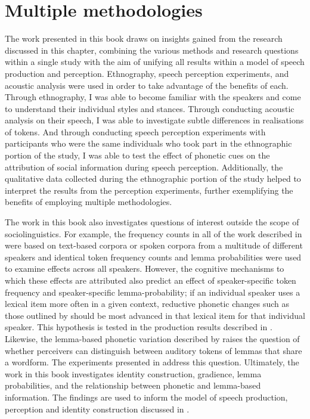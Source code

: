  \section{Multiple methodologies}
The work presented in this book draws on insights gained from the research discussed in this chapter, combining the various methods and research questions within a single study with the aim of unifying all results within a model of speech production and perception. Ethnography, speech perception experiments, and acoustic analysis were used in order to take advantage of the benefits of each. Through ethnography, I was able to become familiar with the speakers and come to understand their individual styles and stances. Through conducting acoustic analysis on their speech, I was able to investigate subtle differences in realisations of tokens. And through conducting speech perception experiments with participants who were the same individuals who took part in the ethnographic portion of the study, I was able to test the effect of phonetic cues on the attribution of social information during speech perception. Additionally, the qualitative data collected during the ethnographic portion of the study helped to interpret the results from the perception experiments, further exemplifying the benefits of employing multiple methodologies.

The work in this book also investigates questions of interest outside the scope of sociolinguistics. For example, the frequency counts in all of the work described in  were based on text-based corpora or spoken corpora from a multitude of different speakers and identical token frequency counts and lemma probabilities were used to examine effects across all speakers. However, the cognitive mechanisms to which these effects are attributed also predict an effect of speaker-specific token frequency and speaker-specific lemma-probability; if an individual speaker uses a lexical item more often in a given context, reductive phonetic changes such as those outlined by \citet{bybee2002} should be most advanced in that lexical item for that individual speaker. This hypothesis is tested in the production results described in . Likewise, the lemma-based phonetic variation described by \citet{gahl-thyme} raises the question of whether perceivers can distinguish between auditory tokens of lemmas that share a wordform. The experiments presented in  address this question. Ultimately, the work in this book investigates identity construction, gradience, lemma probabilities, and the relationship between phonetic and lemma-based information. The findings are used to inform the model of speech production, perception and identity construction discussed in . 

